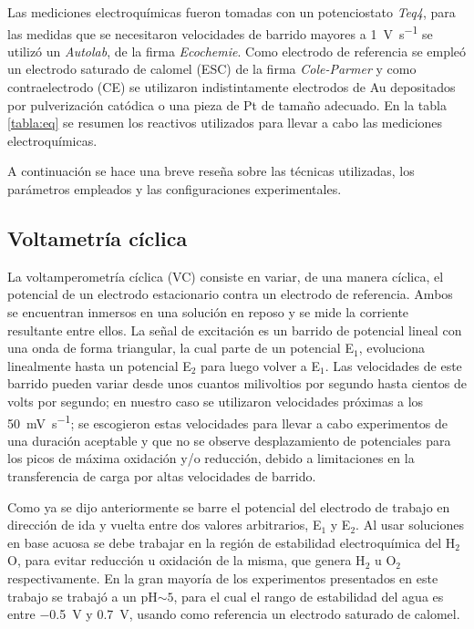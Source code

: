 			  	
			 		  
			Las mediciones electroquímicas fueron tomadas con un potenciostato \textit{Teq4}, para las medidas que se necesitaron velocidades de barrido mayores a \SI{1}{\volt\per\second} se utilizó un \textit{Autolab}, de la firma \textit{Ecochemie}. Como electrodo de referencia se empleó un electrodo saturado de calomel (ESC) de la firma \textit{Cole-Parmer} y como contraelectrodo (CE) se utilizaron indistintamente electrodos de Au depositados por pulverización catódica o una pieza de Pt de tamaño adecuado. En la tabla \ref{tabla:eq} se resumen los reactivos utilizados para llevar a cabo las mediciones electroquímicas. 
			
			A continuación se hace una breve reseña sobre las técnicas utilizadas, los parámetros empleados y las configuraciones experimentales.

			
				
				   		  	
	 \subsection{Voltametría cíclica}
	 		
	 		La voltamperometría cíclica (VC) consiste en variar, de una manera cíclica, el potencial de un electrodo estacionario contra un electrodo de referencia. Ambos se encuentran inmersos en una solución en reposo y se mide la corriente resultante entre ellos. La señal de excitación es un barrido de potencial lineal con una onda de forma triangular, la cual parte de un potencial E$_1$, evoluciona linealmente hasta un potencial E$_2$ para luego volver a E$_1$. Las velocidades de este barrido pueden variar desde unos cuantos milivoltios por segundo hasta cientos de volts por segundo; en nuestro caso se utilizaron velocidades próximas a los \SI{50}{\milli\volt.\second^{-1}}; se escogieron estas velocidades para llevar a cabo experimentos de una duración aceptable y que no se observe desplazamiento de potenciales para los picos de máxima oxidación y/o reducción, debido a limitaciones en la transferencia de carga por altas velocidades de barrido. \cite{nicholson1964,Gewirth2004}

	 		Como ya se dijo anteriormente se barre el potencial del electrodo de trabajo en dirección de ida y vuelta entre dos valores arbitrarios, E$_1$ y E$_2$. Al usar soluciones en base acuosa se debe trabajar en la región de estabilidad electroquímica del H$_2$O, para evitar reducción u oxidación de la misma, que genera H$_2$ u O$_2$ respectivamente. En la gran mayoría de los experimentos presentados en este trabajo se trabajó a un pH$\sim 5$, para el cual el rango de estabilidad del agua es entre \SI{-0.5}{\volt} y \SI{0.7}{\volt}, usando como referencia un electrodo saturado de calomel.\cite{wang2014} 


